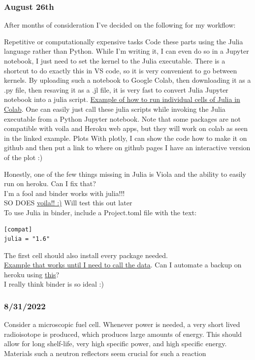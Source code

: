 \documentclass[12pt]{article}
\begin{document}
\subsubsection{August 26th}
After months of consideration I've decided on the following for my workflow: 
\begin{outline}
\1 Repetitive or computationally expensive tasks
    \2 Code these parts using the Julia language rather than Python. While I'm writing it, I can even do so in a Jupyter notebook, I just need to set the kernel to the Julia executable. There is a shortcut to do exactly this in VS code, so it is very convenient to go between kernels. 
    \2 By uploading such a notebook to Google Colab, then downloading it as a .py file, then resaving it as a .jl file, it is very fast to convert Julia Jupyter notebook into a julia script. 
    \2 \href{https://colab.research.google.com/drive/1vUglHFSJJcE75oV5qs9fQFAh6yQPVIiF?usp=sharing}{
    Example of how to run individual cells of Julia in Colab}. One can easily just call these julia scripts while invoking the Julia executable from a Python Jupyter notebook. Note that some packages are not compatible with voila and Heroku web apps, but they will work on colab as seen in the linked example. 
\1 Plots
    \2 With plotly, I can show the code how to make it on github and then put a link to where on github pages I have an interactive version of the plot :) 
\end{outline}
Honestly, one of the few things missing in Julia is Viola and the ability to easily run on heroku. Can I fix that? \\
I'm a fool and binder works with julia!!!\\
SO DOES \href{https://jupyter-tutorial.readthedocs.io/en/stable/web/dashboards/voila/index.html}{voila!! :)}
Will test this out later \\
To use Julia in binder, include a Project.toml file with the text: 
\begin{lstlisting}
[compat]
julia = "1.6"
\end{lstlisting}
The first cell should also install every package needed. \\
\href{https://github.com/MarcosP7635/binder_julia_test}{Example that works until I need to call the data}. Can I automate a backup on heroku using \href{https://binderhub.readthedocs.io/en/latest/zero-to-binderhub/index.html}{this}? \\
I really think binder is so ideal :) \\
\subsubsection{8/31/2022}
Consider a microscopic fuel cell. Whenever power is needed, a very short lived radioisotope is produced, which produces large amounts of energy.
This should allow for long shelf-life, very high specific power, and high specific energy.
Materials such a neutron reflectors seem crucial for such a reaction
\end{document}
